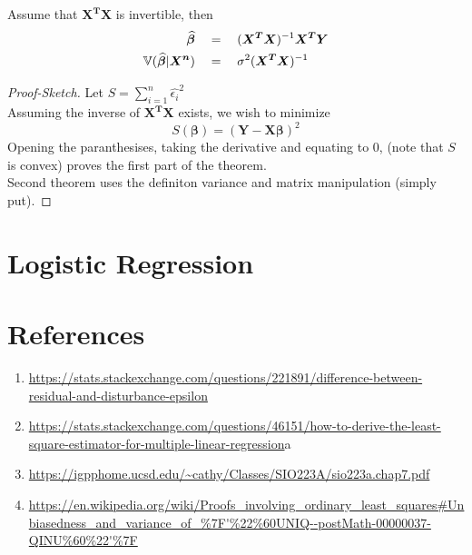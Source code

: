     \begin{theorem}
        Assume that $\boldsymbol{X^TX}$ is invertible, then
        \begin{align*}
            \boldsymbol{\widehat{\beta}} \quad &  = \quad (\boldsymbol{X^TX})^{-1}\boldsymbol{X^TY} \\
            {\mathbb{V}}(\boldsymbol{\widehat{\beta}} | \boldsymbol{X^n}) \quad &  = \quad \sigma^2(\boldsymbol{X^TX})^{-1}
        \end{align*}
        \begin{proof}[Proof-Sketch]
            Let $S = \sum_{i=1}^n \widehat{\epsilon_i}^2$ \\
            Assuming the inverse of $\boldsymbol{X^TX}$ exists, we wish to minimize
            \[ S( \boldsymbol{\beta}) = \left( \boldsymbol{Y} - \boldsymbol{X\beta} \right)^2\]
            Opening the paranthesises, taking the derivative and equating to $0$, (note that $S$ is convex) proves the first part of the theorem. \\
            Second theorem uses the definiton variance and matrix manipulation (simply put).
        \end{proof}
    \end{theorem}
\section{Logistic Regression}
\section{References}
\begin{enumerate}
    \item \url{https://stats.stackexchange.com/questions/221891/difference-between-residual-and-disturbance-epsilon}
    \item \url{https://stats.stackexchange.com/questions/46151/how-to-derive-the-least-square-estimator-for-multiple-linear-regression}a
    \item \url{https://igpphome.ucsd.edu/~cathy/Classes/SIO223A/sio223a.chap7.pdf}
    \item \url{https://en.wikipedia.org/wiki/Proofs_involving_ordinary_least_squares#Unbiasedness_and_variance_of_%7F'%22%60UNIQ--postMath-00000037-QINU%60%22'%7F}
\end{enumerate}

